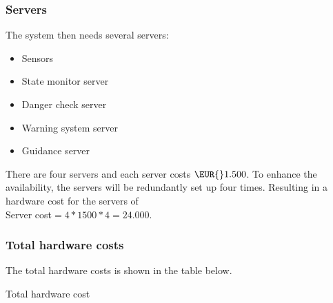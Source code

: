 \subsubsection{Servers}
The system then needs several servers:
\begin{itemize}
	\item Sensors
	\item {State monitor server}
	\item {Danger check server}	
	\item {Warning system server}	
	\item {Guidance server}	
\end{itemize}

There are four servers and each server costs $\EUR{}1.500$. To enhance the availability, the servers will be redundantly set up four times. Resulting in a hardware cost for the servers of\\
Server cost$=4*1500*4=24.000$. 

\subsubsection{Total hardware costs}
The total hardware costs is shown in the table below.
\begin{table}[H]
	\caption{Total hardware cost}
	\label{table:total-hardw-cost}
\end{table}

